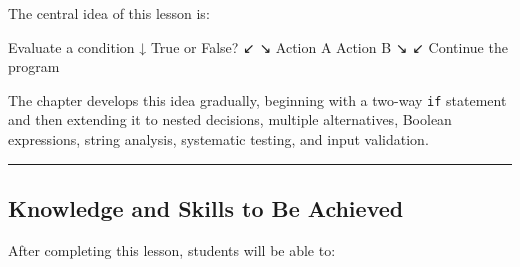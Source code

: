 \documentclass[
  11pt,
  a4paper,
]{article}
\newenvironment{Shaded}{}{}
\newcommand{\NormalTok}[1]{#1}
\begin{document}
The central idea of this lesson is:

\begin{Shaded}
\begin{Highlighting}[]
\NormalTok{Evaluate a condition}
\NormalTok{        ↓}
\NormalTok{   True or False?}
\NormalTok{      ↙      ↘}
\NormalTok{ Action A   Action B}
\NormalTok{      ↘      ↙}
\NormalTok{ Continue the program}
\end{Highlighting}
\end{Shaded}

The chapter develops this idea gradually, beginning with a two-way
\texttt{if} statement and then extending it to nested decisions,
multiple alternatives, Boolean expressions, string analysis, systematic
testing, and input validation.

\begin{center}\rule{0.5\linewidth}{0.5pt}\end{center}

\subsection{Knowledge and Skills to Be
Achieved}\label{knowledge-and-skills-to-be-achieved}

After completing this lesson, students will be able to:
\end{document}
